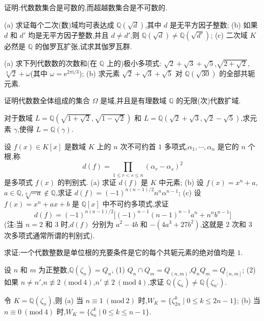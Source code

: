 \begin{Exercises}
  \item 证明:代数数集合是可数的,而超越数集合是不可数的.
  \item (a) 求证每个二次(数)域均可表达成 $\mathbb{Q}(\sqrt{d})$,其中 $d$ 是无平方因子整数;
        (b) 如果 $d$ 和 $d'$ 均是无平方因子整数,并且 $d\neq d'$,则 $\mathbb{Q}(\sqrt{d})\neq\mathbb{Q}(\sqrt{d'})$;
        (c) 二次域 $K$ 必然是 $\mathbb{Q}$ 的伽罗瓦扩张,试求其伽罗瓦群.
  \item (a) 求下列代数数的次数和(在 $\mathbb{Q}$ 上的)极小多项式:
        $\sqrt{2}+\sqrt{3}+\sqrt{5}$,$\sqrt{2+\sqrt{2}}$,$\sqrt[3]{2}+\omega$(其中 $\omega=\mathrm{e}^{2\pi\mathrm{i}/3}$);
        (b) 求元素 $\sqrt{2}+\sqrt{3}+\sqrt{5}$ 对 $\mathbb{Q}(\sqrt{30})$ 的全部共轭元素.
  \item 证明代数数全体组成的集合 $\Omega$ 是域,并且是有理数域 $\mathbb{Q}$ 的无限(次)代数扩域.
  \item 对于数域 $L=\mathbb{Q}(\sqrt{1+\sqrt{2}},\sqrt{1-\sqrt{2}})$ 和 $L=\mathbb{Q}(\sqrt{2}+\sqrt{3},\sqrt{2}-\sqrt{5})$,求元素 $\gamma$,使得 $L=\mathbb{Q}(\gamma)$.
  \item 设 $f(x)\in K[x]$ 是数域 $K$ 上的 $n$ 次不可约首 $1$ 多项式,$\alpha_1,\cdots,\alpha_n$ 是它的 $n$ 个根,称
        \[
          d(f)=\prod_{1\leqslant r<s\leqslant n}(\alpha_r-\alpha_s)^2
        \]
        是多项式 $f(x)$ 的判别式.
        (a) 求证 $d(f)$ 是 $K$ 中元素;
        (b) 设 $f(x)=x^n+a$,$a\in\mathbb{Q}$,$\sqrt[n]{-a}\notin\mathbb{Q}$,求证 $d(f)=(-1)^{n(n-1)/2}n^n\alpha^{n-1}$;
        (c) 设 $f(x)=x^n+ax+b$ 是 $\mathbb{Q}[x]$ 中不可约多项式,求证
        \[
          d(f)=(-1)^{n(n-1)/2}\big[(-1)^{n-1}(n-1)^{n-1}a^n+n^nb^{n-1}\big]
        \]
        (注:当 $n=2$ 和 $3$ 时,$d(f)$ 分别为 $a^2-4b$ 和 $-(4a^3+27b^2)$,这就是 $2$ 次和 $3$ 次多项式通常所谓的判别式).
  \item 求证:一个代数整数是单位根的充要条件是它的每个共轭元素的绝对值均是 $1$.
  \item 设 $n$ 和 $m$ 为正整数,$\mathbb{Q}(\zeta_n)=Q_n$,
        (1) $Q_n\cap Q_m=Q_{(n,m)}$,$Q_nQ_m=Q_{[n,m]}$;
        (2) 如果 $n\neq n'$,$n\not\equiv 2\ (\mathrm{mod}\ 4)$,$n'\not\equiv 2\ (\mathrm{mod}\ 4)$,求证 $\mathbb{Q}(\zeta_n)\neq\mathbb{Q}(\zeta_{n'})$.
  \item 令 $K=\mathbb{Q}(\zeta_n)$,则
        (a) 当 $n\equiv 1\ (\mathrm{mod}\ 2)$ 时,$W_K=\{\zeta_{2n}^k\mid 0\leqslant k\leqslant 2n-1\}$;
        (b) 当 $n\equiv 0\ (\mathrm{mod}\ 4)$ 时,$W_K=\{\zeta_n^k\mid 0\leqslant k\leqslant n-1\}$.

\end{Exercises}
